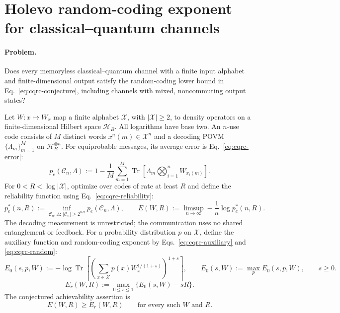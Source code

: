 \section{Holevo random-coding exponent for classical–quantum channels}
\label{sec:op_7eefb7506b175200}

\paragraph{Problem.}
Does every memoryless classical–quantum channel with a finite input alphabet and finite-dimensional output satisfy the random-coding lower bound in Eq.~\eqref{eq:cqrc-conjecture}, including channels with mixed, noncommuting output states?

Let $W:x\mapsto W_x$ map a finite alphabet $\mathcal X$, with $|\mathcal X|\geq2$, to density operators on a finite-dimensional Hilbert space $\mathcal H_B$. All logarithms have base two. An $n$-use code consists of $M$ distinct words $x^n(m)\in\mathcal X^n$ and a decoding POVM $\{\Lambda_m\}_{m=1}^M$ on $\mathcal H_B^{\otimes n}$. For equiprobable messages, its average error is Eq.~\eqref{eq:cqrc-error}:
\begin{equation}
p_e(\mathcal C_n,\Lambda):=1-\frac1M\sum_{m=1}^M\operatorname{Tr}\!\left[\Lambda_m\bigotimes_{i=1}^nW_{x_i(m)}\right].
\label{eq:cqrc-error}
\end{equation}
For $0<R<\log|\mathcal X|$, optimize over codes of rate at least $R$ and define the reliability function using Eq.~\eqref{eq:cqrc-reliability}:
\begin{equation}
p_e^*(n,R):=\inf_{\mathcal C_n,\Lambda:\,|\mathcal C_n|\geq2^{nR}}p_e(\mathcal C_n,\Lambda),
\qquad E(W,R):=\limsup_{n\to\infty}-\frac1n\log p_e^*(n,R).
\label{eq:cqrc-reliability}
\end{equation}
The decoding measurement is unrestricted; the communication uses no shared entanglement or feedback. For a probability distribution $p$ on $\mathcal X$, define the auxiliary function and random-coding exponent by Eqs.~\eqref{eq:cqrc-auxiliary} and \eqref{eq:cqrc-random}:
\begin{equation}
E_0(s,p,W):=-\log\operatorname{Tr}\!\left[\left(\sum_{x\in\mathcal X}p(x)W_x^{1/(1+s)}\right)^{1+s}\right],
\qquad E_0(s,W):=\max_pE_0(s,p,W),\qquad s\geq0.
\label{eq:cqrc-auxiliary}
\end{equation}
\begin{equation}
E_r(W,R):=\max_{0\leq s\leq1}\{E_0(s,W)-sR\}.
\label{eq:cqrc-random}
\end{equation}
The conjectured achievability assertion is
\begin{equation}
E(W,R)\geq E_r(W,R)\qquad\text{for every such }W\text{ and }R.
\label{eq:cqrc-conjecture}
\end{equation}

